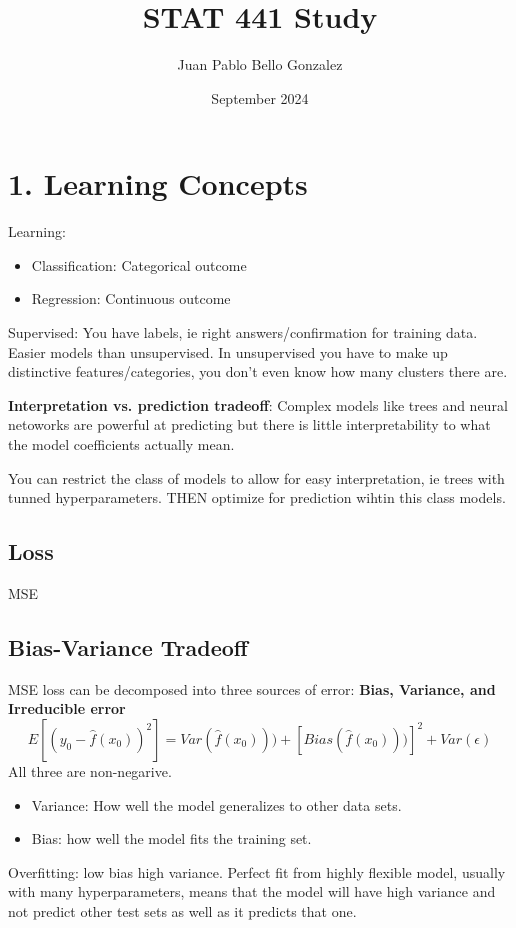\documentclass{article}
\title{STAT 441 Study}
\author{Juan Pablo Bello Gonzalez}
\date{September 2024}
\begin{document}
\maketitle

\newpage

\section{1. Learning Concepts}
Learning:
\begin{itemize}
\item Classification: Categorical outcome
\item Regression: Continuous outcome
\end{itemize}

Supervised: You have labels, ie right answers/confirmation for training data. Easier models than unsupervised. In unsupervised you have to make up distinctive features/categories, you don't even know how many clusters there are.

\textbf{Interpretation vs. prediction tradeoff}:
Complex models like trees and neural netoworks are powerful at predicting but there is little interpretability to what the model coefficients actually mean. 

You can restrict the class of models to allow for easy interpretation, ie trees with tunned hyperparameters. THEN optimize for prediction wihtin this class models. 
\subsection{Loss}
MSE

\subsection{Bias-Variance Tradeoff}
MSE loss can be decomposed into three sources of error: \textbf{Bias, Variance, and Irreducible error} 
\[ E [ (y_0 - \hat f(x_0))^2]
= Var(\hat f(x_0))) + [Bias(\hat f(x_0)))]^2 + Var(\epsilon)
\]
All three are non-negarive. 
\begin{itemize}
\item Variance: How well the model generalizes to other data sets. 
\item Bias: how well the model fits the training set.
\end{itemize}

Overfitting: low bias high variance. Perfect fit  from highly flexible model, usually with many hyperparameters, means that the model will have high variance and not predict other test sets as well as it predicts that one. 
\end{document}
